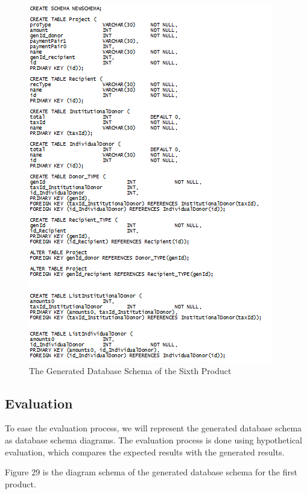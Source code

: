 \documentclass[runningheads,a4paper]{llncs}
\begin{document}
\begin{figure}
	\centering
	\includegraphics[scale=0.9]{create6.png}
	\caption{The Generated Database Schema of the Sixth Product}
	\label{Figure 28}
\end{figure}


\subsection{Evaluation}
To ease the evaluation process, we will represent the generated database schema as database schema diagrams. The evaluation process is done using hypothetical evaluation, which compares the expected results with the generated results.

Figure 29 is the diagram schema of the generated database schema for the first product.
\end{document}

